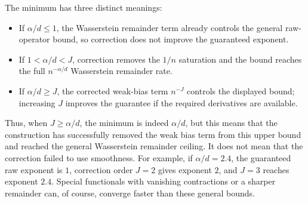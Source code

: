 \documentclass[11pt]{article}
\begin{document}
The minimum has three distinct meanings:
\begin{itemize}
\item If \(\alpha/d\leq1\), the Wasserstein remainder term already
controls the general raw-operator bound, so correction does not improve
the guaranteed exponent.
\item If \(1<\alpha/d<J\), correction removes the \(1/n\) saturation
and the bound reaches the full \(n^{-\alpha/d}\) Wasserstein remainder
rate.
\item If \(\alpha/d\geq J\), the corrected weak-bias term \(n^{-J}\)
controls the displayed bound; increasing \(J\) improves the guarantee
if the required derivatives are available.
\end{itemize}
Thus, when \(J\geq\alpha/d\), the minimum is indeed \(\alpha/d\), but
this means that the construction has successfully removed the weak
bias term from this upper bound and reached the general Wasserstein
remainder ceiling. It does not mean that the correction failed to use
smoothness. For example, if \(\alpha/d=2.4\), the guaranteed raw
exponent is \(1\), correction order \(J=2\) gives exponent \(2\), and
\(J=3\) reaches exponent \(2.4\). Special functionals with vanishing
contractions or a sharper remainder can, of course, converge faster
than these general bounds.
\end{document}
